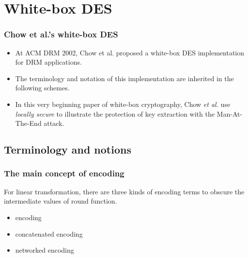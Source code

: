 \documentclass{beamer}
\begin{document}
\section{White-box DES}
\frame
{
  \frametitle{Chow et al.'s white-box DES}

\begin{itemize}
\item At ACM DRM 2002, Chow et al. proposed a white-box DES implementation for DRM applications.
\item The terminology and notation of this implementation are inherited in the following schemes.
\item In this very beginning paper of white-box cryptography, Chow \textit{et al.} use \textit{locally secure} to illustrate the protection of key extraction with the Man-At-The-End attack.
\end{itemize}

\begin{center}
\end{center}
}

\subsection{Terminology and notions}

\frame
{
\frametitle{The main concept of encoding}
For linear transformation, there are three kinds of encoding terms to obscure the intermediate values of round function.
\newline
\begin{itemize}
\item encoding

\item concatenated encoding

\item networked encoding
\end{itemize}
}
\end{document}
